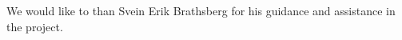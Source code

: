 
\begin{aknowledgements}
We would like to than Svein Erik Brathsberg for his guidance and assistance in the project.
\end{aknowledgements}